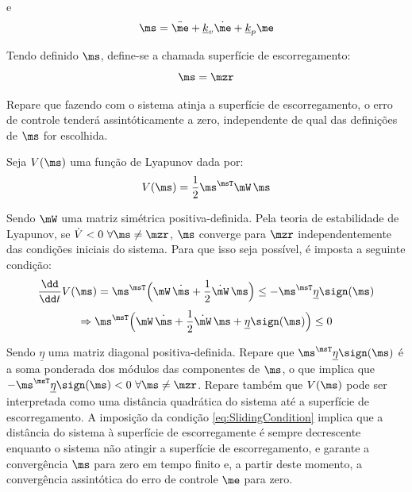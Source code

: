 \documentclass[]{politex}
\begin{document}
e
\begin{equation} \label{eq:SlidingSurfaces_}
\ms = \ddot{\me} + \underline{k}_v\dot{\me} + \underline{k}_p\me
\end{equation}

Tendo definido $\ms$, define-se a chamada superfície de escorregamento:
\begin{equation} \label{eq:SuperficieDeEscorregamento}
\ms = \mzr
\end{equation}

Repare que fazendo com o sistema atinja a superfície de escorregamento, o erro de controle tenderá assintóticamente a zero, independente de qual das definições de $\ms$ for escolhida.
 
Seja $V(\ms)$ uma função de Lyapunov dada por:
\begin{equation}
V(\ms) = \frac{1}{2} \ms^\msT \mW \, \ms
\end{equation}

Sendo $\mW$ uma matriz simétrica positiva-definida. Pela teoria de estabilidade de Lyapunov, se $\dot{V} < 0 \,\, \forall \ms \neq \mzr$, $\ms$ converge para $\mzr$ independentemente das condi\c{c}\~oes iniciais do sistema. Para que isso seja poss\'ivel, \'e imposta a seguinte condi\c{c}\~ao:
\begin{equation} \label{eq:SlidingCondition}
\frac{\dd}{\dd t} V(\ms) = \ms^\msT \Big( \mW \, \dot{\ms} + \frac{1}{2}  \dot{\mW} \, \ms \Big) \leq -   \ms^\msT \underline{\eta} \sign(\ms) 
\end{equation}
\begin{equation}
\Rightarrow \ms^\msT \Big( \mW \, \dot{\ms} + \frac{1}{2}  \dot{\mW} \, \ms + \underline{\eta} \sign(\ms)  \Big) \leq 0
\end{equation}

Sendo $\underline{\eta}$ uma matriz diagonal positiva-definida. Repare que $\ms^\msT \underline{\eta} \sign(\ms)$ \'e a soma ponderada dos m\'odulos das componentes de $\ms$, o que implica que $-  \ms^\msT \underline{\eta} \sign(\ms) < 0 \,\, \forall \ms \neq \mzr$. Repare tamb\'em que $V(\ms)$ pode ser interpretada como uma distância quadrática do sistema até a superfície de escorregamento. A imposição da condição \eqref{eq:SlidingCondition} implica que a distância do sistema à superfície de escorregamente é sempre decrescente enquanto o sistema não atingir a superfície de escorregamento, e garante a convergência $\ms$ para zero em tempo finito e, a partir deste momento, a convergência assintótica do erro de controle $\me$ para zero. 
\end{document}
